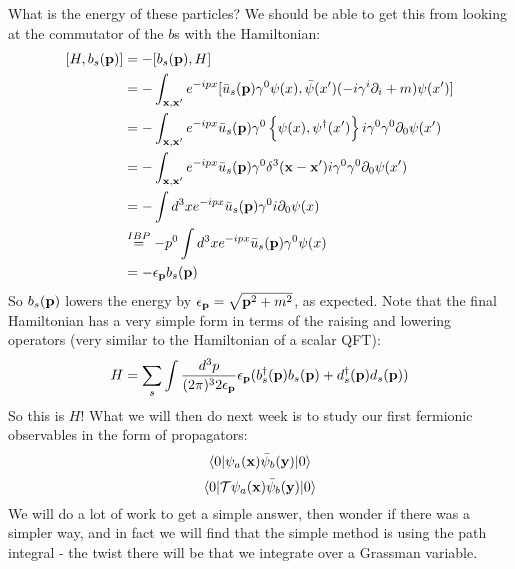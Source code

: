 What is the energy of these particles? We should be able to get this from looking at the commutator of the $b$s with the Hamiltonian:
\begin{equation}
    \begin{split}
        [H, b_s(\mathbf{p})] &= -[b_s(\mathbf{p}), H] 
        \\ &= -\int_{\mathbf{x},\mathbf{x}'}e^{-ipx}[\bar{u}_s(\mathbf{p})\gamma^0\psi(x), \bar{\psi}(x')(-i\gamma^i\partial_i + m)\psi(x')]
        \\ &= -\int_{\mathbf{x},\mathbf{x}'}e^{-ipx}\bar{u}_s(\mathbf{p})\gamma^0\set{\psi(x), \psi^\dagger(x')}i\gamma^0\gamma^0\partial_0 \psi(x')
        \\ &= -\int_{\mathbf{x},\mathbf{x}'}e^{-ipx}\bar{u}_s(\mathbf{p})\gamma^0\delta^3(\mathbf{x}-\mathbf{x}')i\gamma^0\gamma^0\partial_0 \psi(x')
        \\ &= -\int d^3x e^{-ipx} \bar{u}_s(\mathbf{p})\gamma^0i\partial_0\psi(x)
        \\ &\stackrel{IBP}{=} -p^0\int d^3x e^{-ipx} \bar{u}_s(\mathbf{p})\gamma^0\psi(x)
        \\ &= -\epsilon_{\mathbf{p}}b_s(\mathbf{p})
    \end{split}
\end{equation}
So $b_s(\mathbf{p})$ lowers the energy by $\epsilon_{\mathbf{p}} = \sqrt{\mathbf{p}^2 + m^2}$, as expected. Note that the final Hamiltonian has a very simple form in terms of the raising and lowering operators (very similar to the Hamiltonian of a scalar QFT):
\begin{equation}
    H = \sum_s \int \frac{d^3p}{(2\pi)^32\epsilon_{\mathbf{p}}}\epsilon_{\mathbf{p}}(b_s^\dagger(\mathbf{p})b_s(\mathbf{p}) + d_s^\dagger(\mathbf{p})d_s(\mathbf{p}))
\end{equation}
So this is $H$! What we will then do next week is to study our first fermionic observables in the form of propagators:
\begin{equation}
    \langle 0 \rvert\psi_a(\mathbf{x})\bar{\psi}_b(\mathbf{y})\lvert 0 \rangle
\end{equation}
\begin{equation}
    \langle 0 \rvert\mathcal{T}\psi_a(\mathbf{x})\bar{\psi}_b(\mathbf{y})\lvert 0 \rangle
\end{equation}
We will do a lot of work to get a simple answer, then wonder if there was a simpler way, and in fact we will find that the simple method is using the path integral - the twist there will be that we integrate over a Grassman variable.
